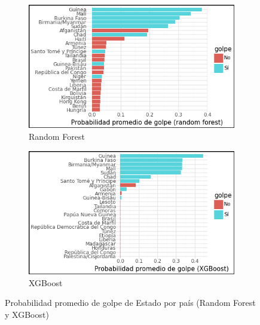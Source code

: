 \documentclass{article}
\begin{document}
\begin{figure}[htbp]
 \centering
 \begin{subfigure}[b]{0.49\textwidth}
  \includegraphics[width=\textwidth]{16_prob_rf_comp.png}
  \caption{Random Forest \label{fig:prob_rf}}
 \end{subfigure}
 \hfill
 \begin{subfigure}[b]{0.49\textwidth}
  \includegraphics[width=\textwidth]{17_prob_xgb_comp.png}
  \caption{XGBoost \label{fig:prob_xgb}}
 \end{subfigure}
 \caption{Probabilidad promedio de golpe de Estado por país (Random Forest y XGBoost) \label{fig:roc_comp}}
\end{figure}
\end{document}

